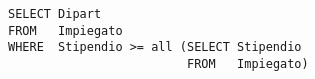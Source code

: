 \begin{lstlisting}
SELECT Dipart
FROM   Impiegato
WHERE  Stipendio >= all (SELECT Stipendio
                         FROM   Impiegato)
\end{lstlisting}
